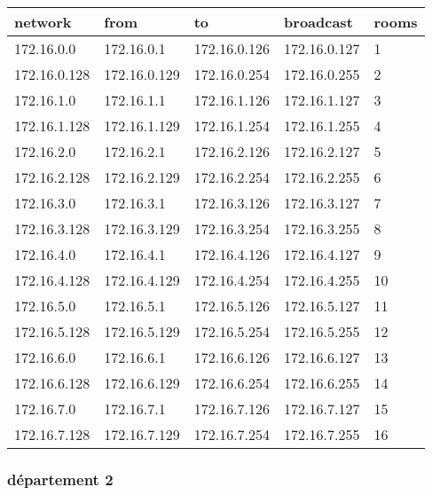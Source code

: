 \documentclass[11pt]{article}
\begin{document}
\begin{center}
\begin{tabular}{|l|l|l|l|l|}
\hline
network & from & to & broadcast & rooms \\
\hline
172.16.0.0 & 172.16.0.1 & 172.16.0.126 & 172.16.0.127 & 1 \\
\hline
172.16.0.128 & 172.16.0.129 & 172.16.0.254 & 172.16.0.255 & 2 \\
\hline
172.16.1.0 & 172.16.1.1 & 172.16.1.126 & 172.16.1.127 & 3 \\
\hline
172.16.1.128 & 172.16.1.129 & 172.16.1.254 & 172.16.1.255 & 4 \\
\hline
172.16.2.0 & 172.16.2.1 & 172.16.2.126 & 172.16.2.127 & 5 \\
\hline
172.16.2.128 & 172.16.2.129 & 172.16.2.254 & 172.16.2.255 & 6 \\
\hline
172.16.3.0 & 172.16.3.1 & 172.16.3.126 & 172.16.3.127 & 7 \\
\hline
172.16.3.128 & 172.16.3.129 & 172.16.3.254 & 172.16.3.255 & 8 \\
\hline
172.16.4.0 & 172.16.4.1 & 172.16.4.126 & 172.16.4.127 & 9 \\
\hline
172.16.4.128 & 172.16.4.129 & 172.16.4.254 & 172.16.4.255 & 10 \\
\hline
172.16.5.0 & 172.16.5.1 & 172.16.5.126 & 172.16.5.127 & 11 \\
\hline
172.16.5.128 & 172.16.5.129 & 172.16.5.254 & 172.16.5.255 & 12 \\
\hline
172.16.6.0 & 172.16.6.1 & 172.16.6.126 & 172.16.6.127 & 13 \\
\hline
172.16.6.128 & 172.16.6.129 & 172.16.6.254 & 172.16.6.255 & 14 \\
\hline
172.16.7.0 & 172.16.7.1 & 172.16.7.126 & 172.16.7.127 & 15 \\
\hline
172.16.7.128 & 172.16.7.129 & 172.16.7.254 & 172.16.7.255 & 16 \\
\hline
\end{tabular}
\end{center}

\subsubsection{département 2}
\label{sec:orgheadline6}
\end{document}
